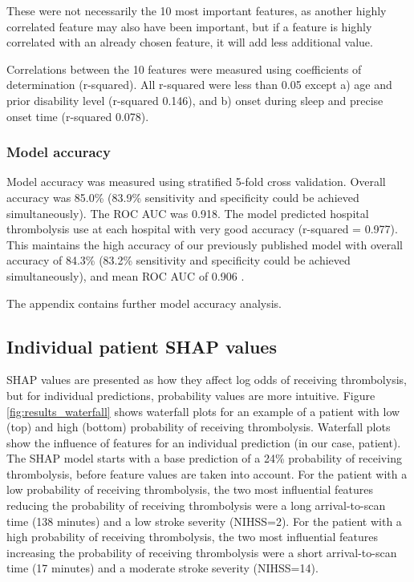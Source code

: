 These were not necessarily the 10 most important features, as another highly correlated feature may also have been important, but if a feature is highly correlated with an already chosen feature, it will add less additional value.

Correlations between the 10 features were measured using coefficients of determination (r-squared). All r-squared were less than 0.05 except a) age and prior disability level (r-squared 0.146), and b) onset during sleep and precise onset time (r-squared 0.078).


\subsubsection{Model accuracy}


Model accuracy was measured using stratified 5-fold cross validation. Overall accuracy was 85.0\% (83.9\% sensitivity and specificity could be achieved simultaneously). The ROC AUC was 0.918. The model predicted hospital thrombolysis use at each hospital with very good accuracy (r-squared = 0.977). This maintains the high accuracy of our previously published model with overall accuracy of 84.3\% (83.2\% sensitivity and specificity could be achieved simultaneously), and mean ROC AUC of 0.906 \cite{allen_use_2022}.

The appendix contains further model accuracy analysis.

\subsection{Individual patient SHAP values}
SHAP values are presented as how they affect log odds of receiving thrombolysis, but for individual predictions, probability values are more intuitive. Figure \ref{fig:results_waterfall} shows waterfall plots for an example of a patient with low (top) and high (bottom) probability of receiving thrombolysis. Waterfall plots show the influence of features for an individual prediction (in our case, patient). The SHAP model starts with a base prediction of a 24\% probability of receiving thrombolysis, before feature values are taken into account. For the patient with a low probability of receiving thrombolysis, the two most influential features reducing the probability of receiving thrombolysis were a long arrival-to-scan time (138 minutes) and a low stroke severity (NIHSS=2). For the patient with a high probability of receiving thrombolysis, the two most influential features increasing the probability of receiving thrombolysis were a short arrival-to-scan time (17 minutes) and a moderate stroke severity (NIHSS=14). 

